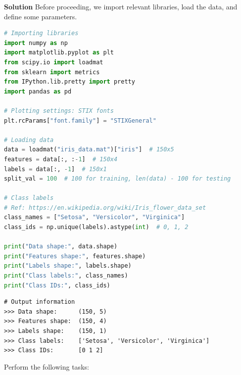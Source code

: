 \documentclass[11pt,a4paper]{article}
\begin{document}
\hrulefill

\textbf{Solution}
Before proceeding, we import relevant libraries, load the data, and define some parameters.

\begin{lstlisting}[language=Python]
# Importing libraries
import numpy as np
import matplotlib.pyplot as plt
from scipy.io import loadmat
from sklearn import metrics
from IPython.lib.pretty import pretty
import pandas as pd

# Plotting settings: STIX fonts
plt.rcParams["font.family"] = "STIXGeneral"

# Loading data
data = loadmat("iris_data.mat")["iris"]  # 150x5
features = data[:, :-1]  # 150x4
labels = data[:, -1]  # 150x1
split_val = 100  # 100 for training, len(data) - 100 for testing

# Class labels
# Ref: https://en.wikipedia.org/wiki/Iris_flower_data_set
class_names = ["Setosa", "Versicolor", "Virginica"]
class_ids = np.unique(labels).astype(int)  # 0, 1, 2

print("Data shape:", data.shape)
print("Features shape:", features.shape)
print("Labels shape:", labels.shape)
print("Class labels:", class_names)
print("Class IDs:", class_ids)
\end{lstlisting}

\begin{lstlisting}[numbers=none, framexleftmargin=2mm, xleftmargin=2mm, framexrightmargin=2mm, xrightmargin=2mm]
# Output information
>>> Data shape:      (150, 5)
>>> Features shape:  (150, 4)
>>> Labels shape:    (150, 1)
>>> Class labels:    ['Setosa', 'Versicolor', 'Virginica']
>>> Class IDs:       [0 1 2]
\end{lstlisting}

\hrulefill

Perform the following tasks:
\end{document}
